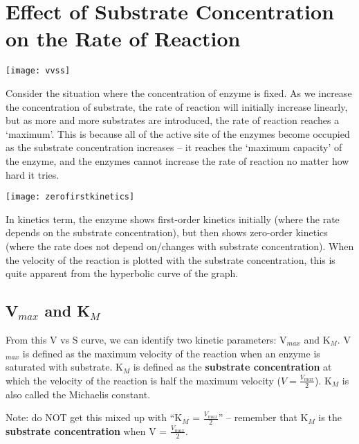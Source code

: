 \section{Effect of Substrate Concentration on the Rate of Reaction}

\begin{center}
\texttt{[image: vvss]}
\end{center}

Consider the situation where the concentration of enzyme is fixed.
As we increase the concentration of substrate, the rate of reaction will initially increase linearly, but as more and more substrates are introduced, the rate of reaction reaches a `maximum'.
This is because all of the active site of the enzymes become occupied as the substrate concentration increases -- it reaches the `maximum capacity' of the enzyme, and the enzymes cannot increase the rate of reaction no matter how hard it tries.

\begin{center}
\texttt{[image: zerofirstkinetics]}
\end{center}

In kinetics term, the enzyme shows first-order kinetics initially (where the rate depends on the substrate concentration), but then shows zero-order kinetics (where the rate does not depend on/changes with substrate concentration).
When the velocity of the reaction is plotted with the substrate concentration, this is quite apparent from the hyperbolic curve of the graph.

\subsection{V$_{max}$ and K$_M$}

From this V vs S curve, we can identify two kinetic parameters: V$_{max}$ and K$_M$.
V$_{max}$ is defined as the maximum velocity of the reaction when an enzyme is saturated with substrate.
K$_M$ is defined as the \textbf{substrate concentration} at which the velocity of the reaction is half the maximum velocity ($V = \frac{V_{max}}{2}$).
K$_M$ is also called the Michaelis constant.

Note: do NOT get this mixed up with ``K$_M$ = $\frac{V_{max}}{2}$'' -- remember that K$_M$ is the \textbf{substrate concentration} when V = $\frac{V_{max}}{2}$.









